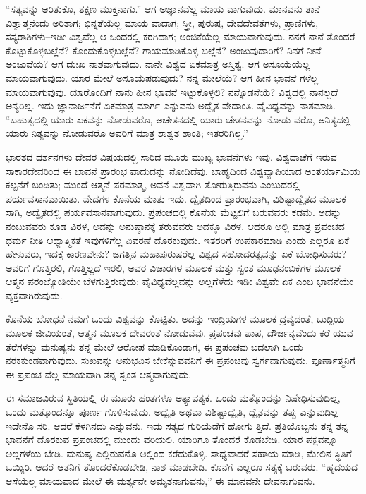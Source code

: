 “ಸತ್ಯವನ್ನು ಅರಿತುಕೊ, ತಕ್ಷಣ ಮುಕ್ತನಾಗು.” ಆಗ ಅಜ್ಞಾನವೆಲ್ಲ ಮಾಯ ವಾಗುವುದು. ಮಾನವನು ತಾನೆ ವಿಶ್ವಾತ್ಮನೆಂದು ಅರಿತಾಗ; ಭಿನ್ನತೆಯೆಲ್ಲ ಮಾಯ ವಾದಾಗ; ಸ್ತ್ರೀ, ಪುರುಷ, ದೇವದೇವತೆಗಳು, ಪ್ರಾಣಿಗಳು, ಸಸ್ಯರಾಶಿಗಳು–ಇಡೀ ವಿಶ್ವವೆಲ್ಲ ಆ ಒಂದರಲ್ಲಿ ಕರಗಿದಾಗ; ಅಂಜಿಕೆಯೆಲ್ಲ ಮಾಯವಾಗುವುದು. ನನಗೆ ನಾನೆ ತೊಂದರೆ ಕೊಟ್ಟುಕೊಳ್ಳಬಲ್ಲೆನೆ? ಕೊಂದುಕೊಳ್ಳಬಲ್ಲೆನೆ? ಗಾಯಮಾಡಿಕೊಳ್ಳ ಬಲ್ಲೆನೆ? ಅಂಜುವುದಾರಿಗೆ? ನಿನಗೆ ನೀನೆ ಅಂಜುವೆಯ? ಆಗ ದುಃಖ ನಾಶವಾಗುವುದು. ನಾನೇ ವಿಶ್ವದ ಏಕಮಾತ್ರ ಅಸ್ತಿತ್ವ. ಆಗ ಅಸೂಯೆಯೆಲ್ಲ ಮಾಯವಾಗುವುದು. ಯಾರ ಮೇಲೆ ಅಸೂಯೆಪಡುವುದು? ನನ್ನ ಮೇಲೆಯೆ? ಆಗ ಹೀನ ಭಾವನೆ ಗಳೆಲ್ಲ ಮಾಯವಾಗುವುವು. ಯಾರೊಂದಿಗೆ ನಾನು ಹೀನ ಭಾವನೆ ಇಟ್ಟುಕೊಳ್ಳಲಿ? ನನ್ನೊಡನೆಯೆ? ವಿಶ್ವದಲ್ಲಿ ನಾನಲ್ಲದೆ ಅನ್ಯರಿಲ್ಲ. ಇದು ಜ್ಞಾನಾರ್ಜನೆಗೆ ಏಕಮಾತ್ರ ಮಾರ್ಗ ಎನ್ನುವನು ಅದ್ವೈತ ವೇದಾಂತಿ. ವೈವಿಧ್ಯವನ್ನು ನಾಶಮಾಡಿ. “ಬಹುತ್ವದಲ್ಲಿ ಯಾರು ಏಕವನ್ನು ನೋಡುವರೊ, ಅಚೇತನದಲ್ಲಿ ಯಾರು ಚೇತನವನ್ನು ನೋಡು ವರೊ, ಅನಿತ್ಯದಲ್ಲಿ ಯಾರು ನಿತ್ಯವನ್ನು ನೋಡುವರೊ ಅವರಿಗೆ ಮಾತ್ರ ಶಾಶ್ವತ ಶಾಂತಿ; ಇತರರಿಗಿಲ್ಲ.”

ಭಾರತದ ದರ್ಶನಗಳು ದೇವರ ವಿಷಯದಲ್ಲಿ ಸಾರಿದ ಮೂರು ಮುಖ್ಯ ಭಾವನೆಗಳು ಇವು. ವಿಶ್ವದಾಚೆಗೆ ಇರುವ ಸಾಕಾರದೇವರಿಂದ ಈ ಭಾವನೆ ಪ್ರಾರಂಭ ವಾದುದನ್ನು ನೋಡಿದೆವು. ಬಾಹ್ಯದಿಂದ ವಿಶ್ವವ್ಯಾಪಿಯಾದ ಅಂತರ್ಯಾಮಿಯ ಕಲ್ಪನೆಗೆ ಬಂದಿತು; ಮುಂದೆ ಆತ್ಮನೆ ಪರಮಾತ್ಮ, ಅವನೆ ವಿಶ್ವವಾಗಿ ತೋರುತ್ತಿರುವನು ಎಂಬುದರಲ್ಲಿ ಪರ್ಯವಸಾನವಾಯಿತು. ವೇದಗಳ ಕೊನೆಯ ಮಾತು ಇದು. ದ್ವೈತದಿಂದ ಪ್ರಾರಂಭವಾಗಿ, ವಿಶಿಷ್ಟಾದ್ವೈತದ ಮೂಲಕ ಸಾಗಿ, ಅದ್ವೈತದಲ್ಲಿ ಪರ್ಯವಸಾನವಾಗುವುದು. ಪ್ರಪಂಚದಲ್ಲಿ ಕೊನೆಯ ಮೆಟ್ಟಲಿಗೆ ಬರುವವರು ಕಡಮೆ. ಅದನ್ನು ನಂಬುವವರು ಕೂಡ ವಿರಳ, ಅದನ್ನು ಅನುಷ್ಠಾನಕ್ಕೆ ತರುವವರು ಅದಕ್ಕೂ ವಿರಳ. ಆದರೂ ಅಲ್ಲಿ ಮಾತ್ರ ಪ್ರಪಂಚದ ಧರ್ಮ ನೀತಿ ಆಧ್ಯಾತ್ಮಿಕತೆ ಇವುಗಳಿಗೆಲ್ಲ ವಿವರಣೆ ದೊರಕುವುದು. ಇತರರಿಗೆ ಉಪಕಾರಮಾಡಿ ಎಂದು ಎಲ್ಲರೂ ಏಕೆ ಹೇಳುವರು, ಇದಕ್ಕೆ ಕಾರಣವೇನು? ಜಗತ್ತಿನ ಮಹಾಪುರುಷರೆಲ್ಲ ವಿಶ್ವದ ಸಹೋದರತ್ವವನ್ನು ಏಕೆ ಬೋಧಿಸುವರು? ಅವರಿಗೆ ಗೊತ್ತಿರಲಿ, ಗೊತ್ತಿಲ್ಲದೆ ಇರಲಿ, ಅವರ ವಿಚಾರಗಳ ಮೂಲಕ ಮತ್ತು ಸ್ವಂತ ಮೂಢನಂಬಿಕೆಗಳ ಮೂಲಕ ಆತ್ಮನ ಪರಂಜ್ಯೋತಿಯೇ ಬೆಳಗುತ್ತಿರುವುದು; ವೈವಿಧ್ಯವೆಲ್ಲವನ್ನು ಅಲ್ಲಗೆಳೆದು ಇಡೀ ವಿಶ್ವವೇ ಏಕ ಎಂಬ ಭಾವನೆಯೇ ವ್ಯಕ್ತವಾಗಿರುವುದು.

ಕೊನೆಯ ಬೋಧನೆ ನಮಗೆ ಒಂದು ವಿಶ್ವವನ್ನು ಕೊಟ್ಟಿತು. ಅದನ್ನು ಇಂದ್ರಿಯಗಳ ಮೂಲಕ ದ್ರವ್ಯದಂತೆ, ಬುದ್ದಿಯ ಮೂಲಕ ಜೀವಿಯಂತೆ, ಆತ್ಮನ ಮೂಲಕ ದೇವರಂತೆ ನೋಡುವೆವು. ಪ್ರಪಂಚವು ಪಾಪ, ದೌರ್ಜನ್ಯವೆಂದು ಕರೆ ಯುವ ತೆರೆಗಳನ್ನು ಮನುಷ್ಯನು ತನ್ನ ಮೇಲೆ ಆರೋಪ ಮಾಡಿಕೊಂಡಾಗ, ಈ ಪ್ರಪಂಚವು ಬದಲಾಗಿ ಒಂದು ನರಕಕುಂಡವಾಗುವುದು. ಸುಖವನ್ನು ಅನುಭವಿಸ ಬೇಕೆನ್ನುವವನಿಗೆ ಈ ಪ್ರಪಂಚವು ಸ್ವರ್ಗವಾಗುವುದು. ಪೂರ್ಣಾತ್ಮನಿಗೆ ಈ ಪ್ರಪಂಚ ವೆಲ್ಲ ಮಾಯವಾಗಿ ತನ್ನ ಸ್ವಂತ ಆತ್ಮವಾಗುವುದು.

ಈ ಸಮಾಜವಿರುವ ಸ್ಥಿತಿಯಲ್ಲಿ ಈ ಮೂರು ಹಂತಗಳೂ ಅತ್ಯಾವಶ್ಯಕ. ಒಂದು ಮತ್ತೊಂದನ್ನು ನಿಷೇಧಿಸುವುದಿಲ್ಲ, ಒಂದು ಮತ್ತೊಂದನ್ನೂ ಪೂರ್ಣ ಗೊಳಿಸುವುದು. ಅದ್ವೈತಿ ಅಥವಾ ವಿಶಿಷ್ಟಾದ್ವೈತಿ, ದ್ವೈತವನ್ನು ತಪ್ಪು ಎನ್ನುವುದಿಲ್ಲ ಇದೇನೊ ಸರಿ. ಆದರೆ ಕೆಳಗಿನದು ಎನ್ನುವನು. ಇದು ಸತ್ಯದ ಗುರಿಯೆಡೆಗೆ ಹೋಗು ತ್ತಿದೆ. ಪ್ರತಿಯೊಬ್ಬನು ತನ್ನ ತನ್ನ ಭಾವನೆಗೆ ದೊರಕುವ ಪ್ರಪಂಚದಲ್ಲಿ ಮುಂದು ವರಿಯಲಿ. ಯಾರಿಗೂ ತೊಂದರೆ ಕೊಡಬೇಡಿ. ಯಾರ ಪಕ್ಷವನ್ನೂ ಅಲ್ಲಗಳೆಯ ಬೇಡಿ. ಮನುಷ್ಯ ಎಲ್ಲಿರುವನೊ ಅಲ್ಲಿಂದ ಕರೆದುಕೊಳ್ಳಿ. ಸಾಧ್ಯವಾದರೆ ಸಹಾಯ ಮಾಡಿ, ಮೇಲಿನ ಸ್ಥಿತಿಗೆ ಒಯ್ಯಿರಿ. ಆದರೆ ಆತನಿಗೆ ತೊಂದರೆಕೊಡಬೇಡಿ, ನಾಶ ಮಾಡಬೇಡಿ. ಕೊನೆಗೆ ಎಲ್ಲರೂ ಸತ್ಯಕ್ಕೆ ಬರುವರು. “ಹೃದಯದ ಆಸೆಯೆಲ್ಲ ಮಾಯವಾದ ಮೇಲೆ ಈ ಮರ್ತ್ಯನೇ ಅಮೃತನಾಗುವನು,” ಈ ಮಾನವನೇ ದೇವನಾಗುವನು.

